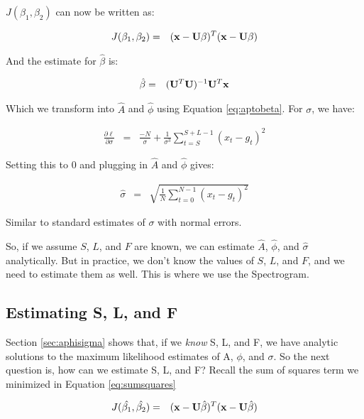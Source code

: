 \documentclass[11pt]{article}
\theoremstyle{plain}
\theoremstyle{definition}
\begin{document}
\noindent $J(\beta_1, \beta_2)$ can now be written as:

\begin{eqnarray}
	\label{eq:sumsquares}
	J(\beta_1, \beta_2) &=& ({\bf x} - {\bf U} {\bf \beta})^T ({\bf x} - {\bf U} {\bf \beta}) 
\end{eqnarray}

\noindent And the estimate for $\hat{\beta}$ is:

\begin{eqnarray}
\label{eq:betahat}
	\hat{\beta} &=& ({\bf U}^T {\bf U})^{-1} {\bf U}^T {\bf x} 
\end{eqnarray}

\noindent Which we transform into $\hat{A}$ and $\hat{\phi}$ using Equation \ref{eq:aptobeta}. For $\sigma$, we have:

\begin{eqnarray}
	\frac{\partial \ell}{\partial \sigma} &=& \frac{-N}{\sigma} + \frac{1}{\sigma^3} \sum_{t=S}^{S+L-1} (x_t - g_t)^2
\end{eqnarray}

\noindent Setting this to $0$ and plugging in $\hat{A}$ and $\hat{\phi}$ gives:

\begin{eqnarray}
	\hat{\sigma} &=& \sqrt{\frac{1}{N} \sum_{t=0}^{N-1} (x_t - g_t)^2}
\end{eqnarray}

\noindent Similar to standard estimates of $\sigma$ with normal errors. 	

So, if we assume $S$, $L$, and $F$ are known, we can estimate $\hat{A}$, $\hat{\phi}$, and $\hat{\sigma}$ analytically. But in practice, we don't know the values of $S$, $L$, and $F$, and we need to estimate them as well. This is where we use the Spectrogram. 

\subsection{Estimating S, L, and F}
\label{sec:slf}
Section \ref{sec:aphisigma} shows that, if we {\it know} S, L, and F, we have analytic solutions to the maximum likelihood estimates of A, $\phi$, and $\sigma$. So the next question is, how can we estimate S, L, and F? Recall the sum of squares term we minimized in Equation \ref{eq:sumsquares}

\begin{eqnarray}
	J(\hat{\beta_1}, \hat{\beta_2}) &=& ({\bf x} - {\bf U} \hat{\beta})^T ({\bf x} - {\bf U} \hat{\beta})
\end{eqnarray}
\end{document}
